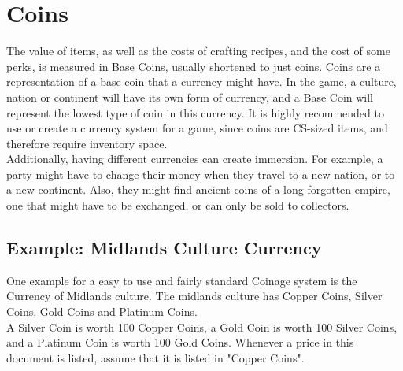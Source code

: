 \chapter{Coins}\label{ch:coins}
The value of items, as well as the costs of crafting recipes, and the cost of some perks, is measured in Base Coins, usually shortened to just coins.
Coins are a representation of a base coin that a currency might have.
In the game, a culture, nation or continent will have its own form of currency, and a Base Coin will represent the lowest type of coin in this currency.
It is highly recommended to use or create a currency system for a game, since coins are CS-sized items, and therefore require inventory space.\\
Additionally, having different currencies can create immersion.
For example, a party might have to change their money when they travel to a new nation, or to a new continent.
Also, they might find ancient coins of a long forgotten empire, one that might have to be exchanged, or can only be sold to collectors.

\section{Example: Midlands Culture Currency}\label{sec:coinExample}
One example for a easy to use and fairly standard Coinage system is the Currency of Midlands culture.
The midlands culture has Copper Coins, Silver Coins, Gold Coins and Platinum Coins.\\
A Silver Coin is worth 100 Copper Coins, a Gold Coin is worth 100 Silver Coins, and a Platinum Coin is worth 100 Gold Coins.
Whenever a price in this document is listed, assume that it is listed in "Copper Coins".

